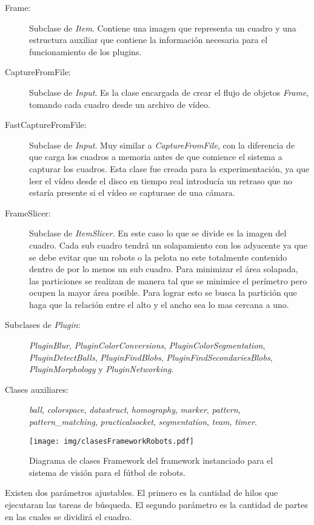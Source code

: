 \begin{description}

\item[Frame:] Subclase de \emph{Item}. Contiene una imagen que representa un
	cuadro y una estructura auxiliar que contiene la información necesaria
	para el funcionamiento de los plugins.

\item[CaptureFromFile:] Subclase de \emph{Input}. Es la clase encargada de crear
	el flujo de objetos \emph{Frame}, tomando cada cuadro desde un archivo
	de vídeo.

\item[FastCaptureFromFile:] Subclase de \emph{Input}. Muy similar a
	\emph{CaptureFromFile}, con la diferencia de que carga los cuadros a
	memoria antes de que comience el sistema a capturar los cuadros. Esta
	clase fue creada para la experimentación, ya que leer el vídeo desde el
	disco en tiempo real introducía un retraso que no estaría presente si el
	vídeo se capturase de una cámara.

\item[FrameSlicer:] Subclase de \emph{ItemSlicer}. En este caso lo que se divide
	es la imagen del cuadro. Cada sub cuadro tendrá un solapamiento con los
	adyacente ya que se debe evitar que un robots o la pelota no este
	totalmente contenido dentro de por lo menos un sub cuadro. Para
	minimizar el área solapada, las particiones se realizan de manera tal
	que se minimice el perímetro pero ocupen la mayor área posible. Para
	lograr esto se busca la partición que haga que la relación entre el alto
	y el ancho sea lo mas cercana a uno.

\item[Subclases de \emph{Plugin}:] \emph{PluginBlur},
	\emph{PluginColorConversions}, \emph{PluginColorSegmentation},
	\emph{PluginDetectBalls}, \emph{PluginFindBlobs},
	\emph{PluginFindSecondariesBlobs}, \emph{PluginMorphology} y
	\emph{PluginNetworking}.

\item[Clases auxiliares:] \emph{ball}, \emph{colorspace}, \emph{datastruct},
	\emph{homography}, \emph{marker}, \emph{pattern},
	\emph{pattern\_matching}, \emph{practicalsocket}, \emph{segmentation},
	\emph{team}, \emph{timer}.

\end{description}

\begin{figure}[h]

	\texttt{[image: img/clasesFrameworkRobots.pdf]}

	\caption{Diagrama de clases Framework del framework instanciado para el
	sistema de visión para el fútbol de robots.}

\end{figure}

Existen dos parámetros ajustables. El primero es la cantidad de hilos que
ejecutaran las tareas de búsqueda. El segundo parámetro es la cantidad de partes
en las cuales se dividirá el cuadro.
